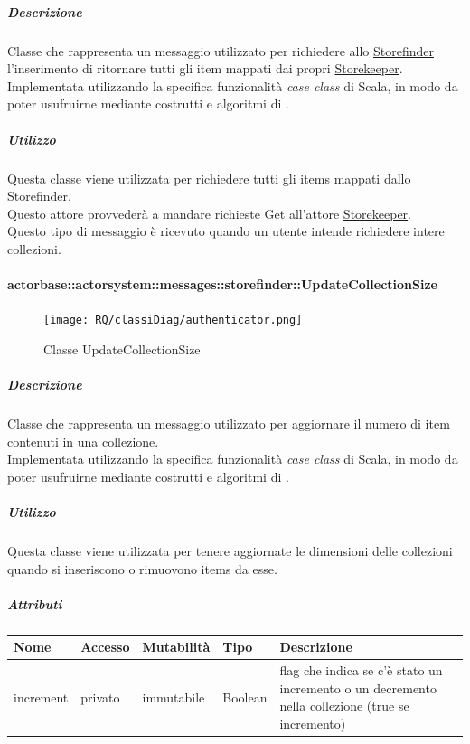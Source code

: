 \documentclass{scalatekids-article}
\begin{document}
\subparagraph{Descrizione}
Classe che rappresenta un messaggio utilizzato per richiedere allo
\hyperref[sec:actorbase::actorsystem::actors::storefinder::Storefinder]{Storefinder} l'inserimento di ritornare tutti gli item mappati dai propri \hyperref[sec:actorbase::actorsystem::actors::storekeeper::Storekeeper]{Storekeeper}.\\Implementata utilizzando la specifica funzionalità \textit{case class} di Scala,
in modo da poter usufruirne mediante costrutti e algoritmi di
.

\subparagraph{Utilizzo}
Questa classe viene utilizzata per richiedere tutti gli items mappati dallo
\hyperref[sec:actorbase::actorsystem::actors::storefinder::Storefinder]{Storefinder}.\\Questo attore provvederà a mandare richieste Get all'attore
\hyperref[sec:actorbase::actorsystem::actors::storekeeper::Storekeeper]{Storekeeper}.\\Questo tipo di messaggio è ricevuto quando un utente intende
richiedere intere collezioni.

\paragraph{actorbase::actorsystem::messages::storefinder::UpdateCollectionSize}
\label{sec:actorbase::actorsystem::messages::storefinder::UpdateCollectionSize}

\begin{figure}[H]
  \begin{center}
    \texttt{[image: RQ/classiDiag/authenticator.png]}
    \caption{Classe UpdateCollectionSize}
  \end{center}
\end{figure}

\subparagraph{Descrizione}
Classe che rappresenta un messaggio utilizzato per aggiornare il numero di item
contenuti in una collezione.\\Implementata utilizzando la specifica funzionalità \textit{case class} di Scala,
in modo da poter usufruirne mediante costrutti e algoritmi di
.

\subparagraph{Utilizzo}
Questa classe viene utilizzata per tenere aggiornate le dimensioni delle
collezioni quando si inseriscono o rimuovono items da esse.

\subparagraph{Attributi}
\begin{tabular}{| p{2cm} | p{1.5cm} | p{2cm} | p{3cm} | p{8.5cm} |}
  \hline
  Nome & Accesso & Mutabilità & Tipo & Descrizione\\
  \hline
  increment & privato & immutabile & Boolean & flag che indica se c'è stato un incremento o un decremento nella collezione (true se incremento)\\
  \hline
\end{tabular}
\end{document}
